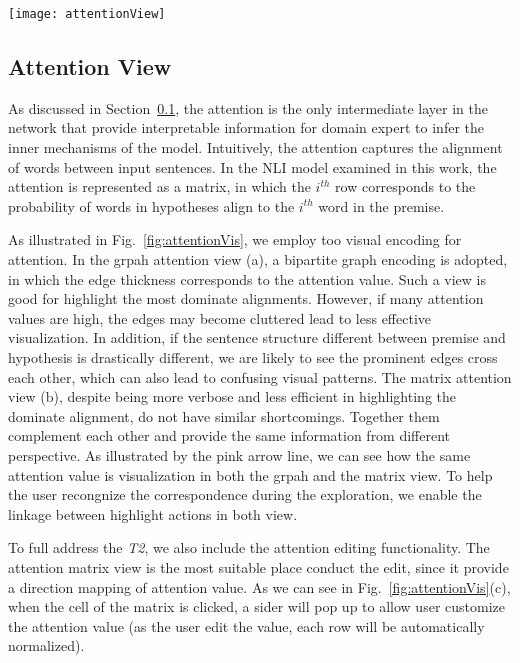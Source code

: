 \begin{figure*}[t]
\centering
\vspace{-2mm}
\texttt{[image: attentionView]}
\caption{
Attention visualization.
}
\label{fig:attentionVis}
\end{figure*}

\subsection{Attention View}
\label{sec:attention}
As discussed in Section~\ref{sec:attention}, the attention is the only intermediate layer in the network that provide interpretable information for domain expert to infer the inner mechanisms of the model.
%
Intuitively, the attention captures the alignment of words between input sentences. In the NLI model examined in this work, the attention is represented as a matrix, in which the $i^{th}$ row corresponds to the probability of words in hypotheses align to the $i^{th}$ word in the premise.

As illustrated in Fig.~\ref{fig:attentionVis}, we employ too visual encoding for attention. In the grpah attention view (a), a bipartite graph encoding is adopted, in which the edge thickness corresponds to the attention value. Such a view is good for highlight the most dominate alignments. However, if many attention values are high, the edges may become cluttered lead to less effective visualization. In addition, if the sentence structure different between premise and hypothesis is drastically different, we are likely to see the prominent edges cross each other, which can also lead to confusing visual patterns. The matrix attention view (b), despite being more verbose and less efficient in highlighting the dominate alignment, do not have similar shortcomings. Together them complement each other and provide the same information from different perspective. As illustrated by the pink arrow line, we can see how the same attention value is visualization in both the grpah and the matrix view.
To help the user recongnize the correspondence during the exploration, we enable the linkage between highlight actions in both view.

To full address the \emph{T2}, we also include the attention editing functionality. The attention matrix view is the most suitable place conduct the edit, since it provide a direction mapping of attention value.
As we can see in Fig.~\ref{fig:attentionVis}(c), when the cell of the matrix is clicked, a sider will pop up to allow user customize the attention value (as the user edit the value, each row will be automatically normalized).


